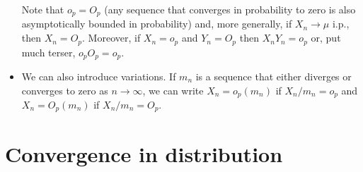 \begin{itemize}[leftmargin=0pt]
  Note that $o_p = O_p$ (any sequence that converges in probability to
  zero is also asymptotically bounded in probability) and, more
  generally, if $X_n \to \mu$ i.p., then $X_n = O_p$.  Moreover, if $X_n =
  o_p$ and $Y_n = O_p$ then $X_n Y_n = o_p$ or, put much terser, $o_p
  O_p = o_p$.

\item We can also introduce variations.  If $m_n$ is a sequence that
  either diverges or converges to zero as $n \to \infty$, we can write $X_n =
  o_p(m_n)$ if $X_n / m_n = o_p$ and $X_n = O_p(m_n)$ if $X_n / m_n =
  O_p$.
\end{itemize}

\section{Convergence in distribution}

